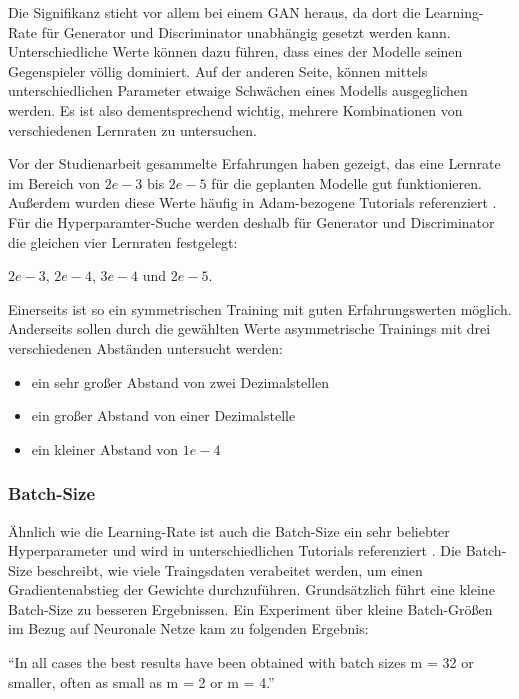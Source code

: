 Die Signifikanz sticht vor allem bei einem GAN heraus, da dort die Learning-Rate für Generator und Discriminator unabhängig gesetzt werden kann.
Unterschiedliche Werte können dazu führen, dass eines der Modelle seinen Gegenspieler völlig dominiert.
Auf der anderen Seite, können mittels unterschiedlichen Parameter etwaige Schwächen eines Modells ausgeglichen werden.
Es ist also dementsprechend wichtig, mehrere Kombinationen von verschiedenen Lernraten zu untersuchen.
\newline

Vor der Studienarbeit gesammelte Erfahrungen haben gezeigt, das eine Lernrate im Bereich von \(2e-3\) bis \(2e-5\) für die geplanten Modelle gut funktionieren.
Außerdem wurden diese Werte häufig in Adam-bezogene Tutorials referenziert \cite{adam-tutorial}.
Für die Hyperparamter-Suche werden deshalb für Generator und Discriminator die gleichen vier Lernraten festgelegt:

\begin{center} \(2e-3\), \(2e-4\), \(3e-4\) und \(2e-5\). \end{center}
 
Einerseits ist so ein symmetrischen Training mit guten Erfahrungswerten möglich.
Anderseits sollen durch die gewählten Werte asymmetrische Trainings mit drei verschiedenen Abständen untersucht werden:
\begin{itemize}
	\item ein sehr großer Abstand von zwei Dezimalstellen
	\item ein großer Abstand von einer Dezimalstelle
	\item ein kleiner Abstand von \(1e-4\)
\end{itemize}	

\subsubsection{Batch-Size}
Ähnlich wie die Learning-Rate ist auch die Batch-Size ein sehr beliebter Hyperparameter und wird in unterschiedlichen Tutorials referenziert \cite{tutorial:tune-batch-size-analyticsvidhya, tutorial:tune-batch-size-machinelearningmastery}.
Die Batch-Size beschreibt, wie viele Traingsdaten verabeitet werden, um einen Gradientenabstieg der Gewichte durchzuführen.
Grundsätzlich führt eine kleine Batch-Size zu besseren Ergebnissen.
Ein Experiment über kleine Batch-Größen im Bezug auf Neuronale Netze kam zu folgenden Ergebnis: 

\begin{center}
	\enquote{In all cases the best results have been obtained with batch sizes m = 32 or smaller, often as small as m = 2 or m = 4.}\cite[S. 16, Z. 5-7]{small-batch-size}
\end{center}

